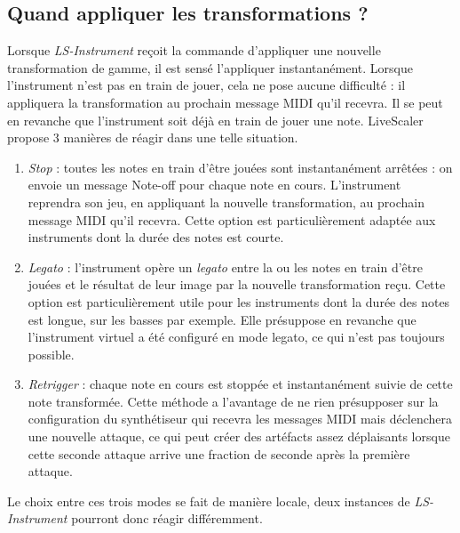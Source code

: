 \subsection{Quand appliquer les transformations ? }
Lorsque \emph{LS-Instrument} reçoit la commande d'appliquer une nouvelle transformation de gamme, il est sensé l'appliquer instantanément. Lorsque l'instrument n'est pas en train de jouer, cela ne pose aucune difficulté : il appliquera la transformation au prochain message MIDI qu'il recevra. Il se peut en revanche que l'instrument soit déjà en train de jouer une note. LiveScaler propose $3$ manières de réagir dans une telle situation. 


\begin{enumerate}
  \item \emph{Stop} : toutes les notes en train d'être jouées sont instantanément arrêtées : on envoie un message Note-off pour chaque note en cours. L'instrument reprendra son jeu, en appliquant la nouvelle transformation, au prochain message MIDI qu'il recevra. Cette option est particulièrement adaptée aux instruments dont la durée des notes est courte. 
  \item \emph{Legato} : l'instrument opère un \emph{legato} entre la ou les notes en train d'être jouées et le résultat de leur image par la nouvelle transformation reçu. Cette option est particulièrement utile pour les instruments dont la durée des notes est longue, sur les basses par exemple. Elle présuppose en revanche que l'instrument virtuel a été configuré en mode legato, ce qui n'est pas toujours possible.
  \item \emph{Retrigger} : chaque note en cours est stoppée et instantanément suivie de cette note transformée. Cette méthode a l'avantage de ne rien présupposer sur la configuration du synthétiseur qui recevra les messages MIDI mais déclenchera une nouvelle attaque, ce qui peut créer des artéfacts assez déplaisants lorsque cette seconde attaque arrive une fraction de seconde après la première attaque.
  
  
\end{enumerate}

Le choix entre ces trois modes se fait de manière locale, deux instances de \emph{LS-Instrument} pourront donc réagir différemment.
